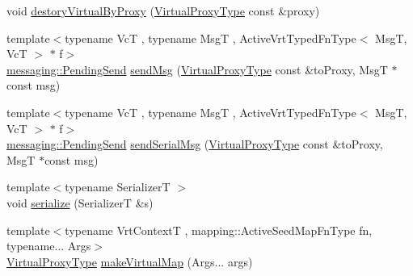 \begin{DoxyCompactItemize}
\item 
void \hyperlink{structvt_1_1vrt_1_1_virtual_context_manager_ae2e086766e9ce708e2e574d2cf59975b}{destory\+Virtual\+By\+Proxy} (\hyperlink{namespacevt_a1b417dd5d684f045bb58a0ede70045ac}{Virtual\+Proxy\+Type} const \&proxy)
\item 
{\footnotesize template$<$typename VcT , typename MsgT , Active\+Vrt\+Typed\+Fn\+Type$<$ Msg\+T, Vc\+T $>$ $\ast$ f$>$ }\\\hyperlink{structvt_1_1messaging_1_1_pending_send}{messaging\+::\+Pending\+Send} \hyperlink{structvt_1_1vrt_1_1_virtual_context_manager_a0e2611d1a11ebdaa50f7e2d69332039d}{send\+Msg} (\hyperlink{namespacevt_a1b417dd5d684f045bb58a0ede70045ac}{Virtual\+Proxy\+Type} const \&to\+Proxy, MsgT $\ast$const msg)
\item 
{\footnotesize template$<$typename VcT , typename MsgT , Active\+Vrt\+Typed\+Fn\+Type$<$ Msg\+T, Vc\+T $>$ $\ast$ f$>$ }\\\hyperlink{structvt_1_1messaging_1_1_pending_send}{messaging\+::\+Pending\+Send} \hyperlink{structvt_1_1vrt_1_1_virtual_context_manager_acad60c848d71b958be05e41993fc66c2}{send\+Serial\+Msg} (\hyperlink{namespacevt_a1b417dd5d684f045bb58a0ede70045ac}{Virtual\+Proxy\+Type} const \&to\+Proxy, MsgT $\ast$const msg)
\item 
{\footnotesize template$<$typename SerializerT $>$ }\\void \hyperlink{structvt_1_1vrt_1_1_virtual_context_manager_a9777d26df90142843e9356e083d59251}{serialize} (SerializerT \&s)
\item 
{\footnotesize template$<$typename Vrt\+ContextT , mapping\+::\+Active\+Seed\+Map\+Fn\+Type fn, typename... Args$>$ }\\\hyperlink{namespacevt_a1b417dd5d684f045bb58a0ede70045ac}{Virtual\+Proxy\+Type} \hyperlink{structvt_1_1vrt_1_1_virtual_context_manager_a281e670da4eb6e06ecdb4ef470e1a61d}{make\+Virtual\+Map} (Args... args)
\end{DoxyCompactItemize}
